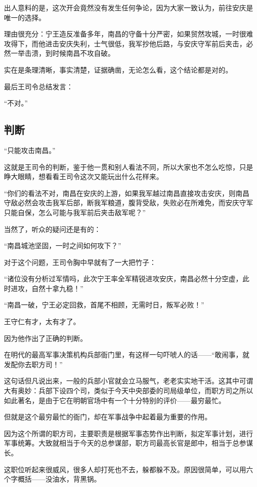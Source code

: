 \begin{multicols}{\theparacolNo}
		出人意料的是，这次开会竟然没有发生任何争论，因为大家一致认为，前往安庆是唯一的选择。

		理由很充分：宁王造反准备多年，南昌的守备十分严密，如果贸然攻城，一时很难攻得下，而他进击安庆失利，士气很低，我军抄他后路，与安庆守军前后夹击，必然一举击溃，到时候南昌不攻自破。

		实在是条理清晰，事实清楚，证据确凿，无论怎么看，这个结论都是对的。

		最后王司令总结发言：

		“不对。”

		\subsection{判断}
		“只能攻击南昌。”

		这就是王司令的判断，鉴于他一贯和别人看法不同，所以大家也不怎么吃惊，只是睁大眼睛，想看看王司令这次又能玩出什么花样来。

		“你们的看法不对，南昌在安庆的上游，如果我军越过南昌直接攻击安庆，则南昌守敌必然会攻击我军后部，断我军粮道，腹背受敌，失败必在所难免，而安庆守军只能自保，怎么可能与我军前后夹击敌军呢？”

		当然了，听众的疑问还是有的：

		“南昌城池坚固，一时之间如何攻下？”

		对于这个问题，王司令胸中早就有了一大把竹子：

		“诸位没有分析过军情吗，此次宁王率全军精锐进攻安庆，南昌必然十分空虚，此时进攻，自然十拿九稳！”

		“南昌一破，宁王必定回救，首尾不相顾，无需时日，叛军必败！”

		王守仁有才，太有才了。

		因为他作出了正确的判断。

		在明代的最高军事决策机构兵部衙门里，有这样一句吓唬人的话——“敢闹事，就发配你去职方司！”

		这句话但凡说出来，一般的兵部小官就会立马服气，老老实实地干活。这其中可谓大有奥妙：兵部下设四个司，类似于今天中央部委的司局级单位，而职方司之所以如此著名，是由于它在明朝官场中有一个十分特别的评价——最穷最忙。

		但就是这个最穷最忙的衙门，却在军事战争中起着最为重要的作用。

		因为这个所谓的职方司，主要职责是根据军事态势作出判断，拟定军事计划，进行军事统筹。大致就相当于今天的总参谋部，职方司最高长官是郎中，相当于总参谋长。

		这职位听起来很威风，很多人却打死也不去，躲都躲不及。原因很简单，可以用六个字概括——没油水，背黑锅。


\end{multicols}
